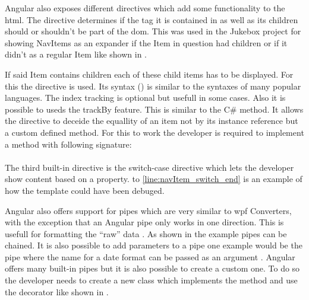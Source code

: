 
Angular also exposes different directives which add some functionality to the \gls{html}. The  directive determines if the tag it is contained in as well as its children should or shouldn't be part of the \gls{dom}. This was used in the Jukebox project for showing NavItems as an expander if the Item in question had children or if it didn't as a regular Item like shown in .

If said Item contains children each of these child items has to be displayed. For this the  directive is used. Its syntax () is similar to the  syntaxes of many popular languages. The index tracking is optional but usefull in some cases. Also it is possible to useds the trackBy feature. This is similar to the  C\# method. It allows the  directive to deceide the equallity of an item not by its instance reference but a custom defined method. For this to work the developer is required to implement a method with following signature:\\
\\

The third built-in directive is the switch-case directive which lets the developer show content based on a property.  to \ref{line:navItem_switch_end} is an example of how the  template could have been debuged.


Angular also offers support for pipes which are very similar to \gls{wpf} Converters, with the exception that an Angular pipe only works in one direction. This is usefull for formatting the \enquote{raw} data \zB {}. As shown in the example pipes can be chained. It is also possible to add parameters to a pipe one example would be the  pipe where the name for a date format can be passed as an argument \zB {}. Angular offers many built-in pipes but it is also possible to create a custom one. To do so the developer needs to create a new class which implements the  method and use the  decorator like shown in .


\cite{angularTemplateSyntax}



